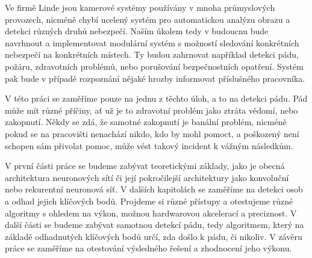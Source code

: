 Ve firmě Linde jsou kamerové systémy používány v mnoha průmyslových provozech,
nicméně chybí ucelený systém pro automatickou analýzu obrazu a detekci různých
druhů nebezpečí. Naším úkolem tedy v budoucnu bude navrhnout a implementovat
modulární systém s možností sledování konkrétních nebezpečí na konkrétních
místech. Ty budou zahrnovat například detekci pádu, požáru, zdravotních
problémů, nebo porušování bezpečnostních opatření. Systém pak bude v případě
rozpoznání nějaké hrozby informovat příslušného pracovníka.

V této práci se zaměříme pouze na jednu z těchto úloh, a to na detekci pádu.
Pád může mít různé příčiny, ať už je to zdravotní problém jako ztráta vědomí,
nebo zakopnutí. Někdy se zdá, že samotné zakopnutí je banální problém, nicméně
pokud se na pracovišti nenachází nikdo, kdo by mohl pomoct, a poškozený není
schopen sám přivolat pomoc, může vést takový incident k vážným následkům.

V první části práce se budeme zabývat teoretickými základy, jako je obecná
architektura neuronových sítí či její pokročilejší architektury jako konvoluční
nebo rekurentní neuronová síť. V dalších kapitolách se zaměříme na detekci osob
a odhad jejich klíčových bodů. Projdeme si různé přístupy a otestujeme různé
algoritmy s ohledem na výkon, možnou hardwarovou akcelerací a preciznost. V
další části se budeme zabývat samotnou detekcí pádu, tedy algoritmem, který na
základě odhadnutých klíčových bodů určí, zda došlo k pádu, či nikoliv. V závěru
práce se zaměříme na otestování výsledného řešení a zhodnocení jeho výkonu.

\endinput